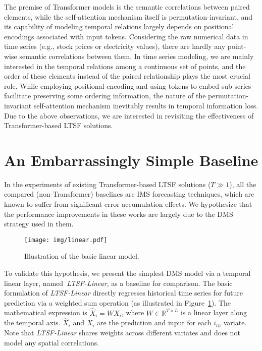 \documentclass[10pt,twocolumn,letterpaper]{article}
\newcommand{\modelname}{\emph{LTSF-Linear}\xspace}
\begin{document}
The premise of Transformer models is the semantic correlations between paired elements, while the self-attention mechanism itself is permutation-invariant, and its capability of modeling temporal relations largely depends on positional encodings associated with input tokens. Considering the raw numerical data in time series (e.g., stock prices or electricity values), there are hardly any point-wise semantic correlations between them. In time series modeling, we are mainly interested in the temporal relations among a continuous set of points, and the order of these elements instead of the paired relationship plays the most crucial role. While employing positional encoding and using tokens to embed sub-series facilitate preserving some ordering information, the nature of the permutation-invariant self-attention mechanism inevitably results in temporal information loss. Due to the above observations, we are interested in revisiting the effectiveness of Transformer-based LTSF solutions. 
 
\section{An Embarrassingly Simple Baseline}
\label{sec:method_simple}

In the experiments of existing Transformer-based LTSF solutions ($T\gg1$), all the compared (non-Transformer) baselines are IMS forecasting techniques, which are known to suffer from significant error accumulation effects. We hypothesize that the performance improvements in these works are largely due to the DMS strategy used in them. 

\begin{figure}[h]
\begin{center}
\texttt{[image: img/linear.pdf]}
\end{center}
\vspace{-0.3cm}
\caption{Illustration of the basic linear model.}
\vspace{-0.3cm}
\label{fig:Linear}
\end{figure}


To validate this hypothesis, we present the simplest DMS model via a temporal linear layer, named~\modelname, as a baseline for comparison. The basic formulation of \modelname directly regresses historical time series for future prediction via a weighted sum operation (as illustrated in Figure~\ref{fig:Linear}).
The mathematical expression is 
$\hat{X}_{i} = WX_i$, where $W\in \mathbb{R}^{T\times L}$ is a linear layer along the temporal axis. $\hat{X}_{i}$ and $X_i$ are the prediction and input for each $i_{th}$ variate. Note that \modelname shares weights across different variates and does not model any spatial correlations.
\end{document}
